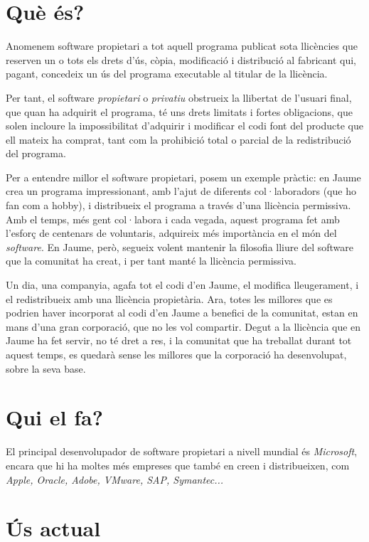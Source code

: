 \section{Què és?}

	Anomenem software propietari a tot aquell programa publicat sota llicències
	que reserven un o tots els drets d'ús, còpia, modificació i distribució
	al fabricant qui, pagant, concedeix un ús del programa executable al titular
	de la llicència.

	Per tant, el software \emph{propietari} o \emph{privatiu} obstrueix la llibertat
	de l'usuari final, que quan ha adquirit el programa, té uns drets limitats i fortes
	obligacions, que solen incloure la impossibilitat d'adquirir i modificar el codi font del producte
	que ell mateix ha comprat, tant com la prohibició total o parcial de la redistribució del programa.
	\cite{gnucategories}

	Per a entendre millor el software propietari, posem un exemple pràctic:	en Jaume crea un programa impressionant, amb l'ajut de diferents col·laboradors (que ho fan com a hobby),
	i distribueix el programa a través d'una llicència permissiva. Amb el temps, més gent col·labora i cada vegada,
	aquest programa fet amb l'esforç de centenars de voluntaris, adquireix més importància en el món del \emph{software}.
	En Jaume, però, segueix volent mantenir la filosofia lliure del software que la comunitat ha creat, i per tant
	manté la llicència permissiva.
	
	Un dia, una companyia, agafa tot el codi d'en Jaume, el modifica lleugerament, i
	el redistribueix amb una llicència propietària. Ara, totes les millores que es podrien haver incorporat
	al codi d'en Jaume a benefici de la comunitat, estan en mans d'una gran corporació, que no les vol compartir.
	Degut a la llicència que en Jaume ha fet servir, no té dret a res, i la comunitat que ha treballat durant tot aquest temps,
	es quedarà sense les millores que la corporació ha desenvolupat, sobre la seva base.

\section{Qui el fa?}

	El principal desenvolupador de software propietari a nivell mundial és \emph{Microsoft}, encara que hi
	ha moltes més empreses que també en creen i distribueixen, com \emph{Apple, Oracle, Adobe, VMware,
	SAP, Symantec...} \cite{propietariempreses}

\section{Ús actual}


